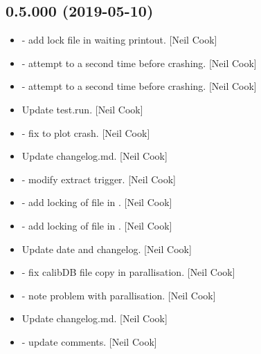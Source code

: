 \documentclass[a4paper,10pt,english]{report}
\begin{document}
\subsection{0.5.000 (2019-05-10)}
\label{\detokenize{misc/changelog:id136}}\begin{itemize}
\item {} 
 - add lock file in waiting printout. {[}Neil Cook{]}

\item {} 
 - attempt to  a second time before crashing.
{[}Neil Cook{]}

\item {} 
 - attempt to  a second time before crashing.
{[}Neil Cook{]}

\item {} 
Update test.run. {[}Neil Cook{]}

\item {} 
 - fix to plot crash. {[}Neil Cook{]}

\item {} 
Update changelog.md. {[}Neil Cook{]}

\item {} 
 - modify extract trigger. {[}Neil Cook{]}

\item {} 
 - add locking of file in . {[}Neil Cook{]}

\item {} 
 - add locking of file in . {[}Neil Cook{]}

\item {} 
Update date and changelog. {[}Neil Cook{]}

\item {} 
 - fix calibDB file copy in parallisation. {[}Neil Cook{]}

\item {} 
 - note problem with parallisation. {[}Neil Cook{]}

\item {} 
Update changelog.md. {[}Neil Cook{]}

\item {} 
 - update comments. {[}Neil Cook{]}


\end{itemize}
\end{document}
